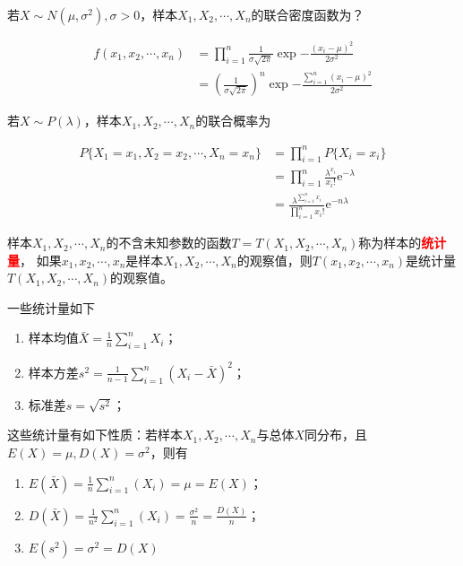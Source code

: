 \begin{example}
    若$X\sim N(\mu,\sigma^2),\sigma>0$，样本$X_1,X_2,\cdots,X_n$的联合密度函数为？
\end{example}
\begin{solution}
    \begin{align*}
        f(x_1,x_2,\cdots,x_n)
         & = \prod_{i=1}^n \frac{1}{\sigma\sqrt{2\pi}}\exp{-\frac{(x_i-\mu)^2}{2\sigma^2}}                \\
         & = \left(\frac{1}{\sigma\sqrt{2\pi}}\right)^n \exp{-\frac{\sum_{i=1}^n (x_i-\mu)^2}{2\sigma^2}}
    \end{align*}
\end{solution}

\begin{example}
    若$X\sim P(\lambda)$，样本$X_1,X_2,\cdots,X_n$的联合概率为
\end{example}
\begin{solution}
    \begin{align*}
        P\{X_1=x_1,X_2=x_2,\cdots,X_n=x_n\}
         & = \prod_{i=1}^n P\{X_i=x_i\}                                                   \\
         & = \prod_{i=1}^n \frac{\lambda^{x_i}}{x_i!}\mathrm{e}^{-\lambda}                \\
         & = \frac{\lambda^{\sum_{i=1}^n x_i}}{\prod_{i=1}^n x_i!} \mathrm{e}^{-n\lambda}
    \end{align*}
\end{solution}

样本$X_1,X_2,\cdots,X_n$的不含未知参数的函数$T=T(X_1,X_2,\cdots,X_n)$称为样本的\textcolor{red}{\textbf{\textsf{统计量}}}，
如果$x_1,x_2,\cdots,x_n$是样本$X_1,X_2,\cdots,X_n$的观察值，则$T(x_1,x_2,\cdots,x_n)$是统计量$T(X_1,X_2,\cdots,X_n)$的观察值。

一些统计量如下
\begin{enumerate}[(1)]
    \item 样本均值$\displaystyle \bar{X}=\frac{1}{n}\sum_{i=1}^n X_i$；
    \item 样本方差$\displaystyle s^2 = \frac{1}{n-1}\sum_{i=1}^n \left(X_i - \bar{X}\right)^2$；
    \item 标准差$s = \sqrt{s^2}$；
\end{enumerate}

这些统计量有如下性质：若样本$X_1,X_2,\cdots,X_n$与总体$X$同分布，且$E(X)=\mu, D(X) = \sigma^2$，则有
\begin{enumerate}[(1)]
    \item $E\left(\bar{X}\right) = \frac{1}{n}\sum_{i=1}^n (X_i) = \mu = E(X)$；
    \item $D\left(\bar{X}\right) = \frac{1}{n^2}\sum_{i=1}^n(X_i) = \frac{\sigma^2}{n} = \frac{D(X)}{n}$；
    \item $E(s^2) = \sigma^2 = D(X)$
\end{enumerate}

